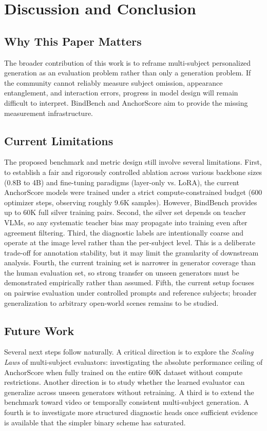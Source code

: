 \section{Discussion and Conclusion}

\subsection{Why This Paper Matters}
The broader contribution of this work is to reframe multi-subject personalized generation as an evaluation problem rather than only a generation problem. If the community cannot reliably measure subject omission, appearance entanglement, and interaction errors, progress in model design will remain difficult to interpret. BindBench and AnchorScore aim to provide the missing measurement infrastructure.

\subsection{Current Limitations}
The proposed benchmark and metric design still involve several limitations. First, to establish a fair and rigorously controlled ablation across various backbone sizes (0.8B to 4B) and fine-tuning paradigms (layer-only vs. LoRA), the current AnchorScore models were trained under a strict compute-constrained budget (600 optimizer steps, observing roughly 9.6K samples). However, BindBench provides up to 60K full silver training pairs. Second, the silver set depends on teacher VLMs, so any systematic teacher bias may propagate into training even after agreement filtering. Third, the diagnostic labels are intentionally coarse and operate at the image level rather than the per-subject level. This is a deliberate trade-off for annotation stability, but it may limit the granularity of downstream analysis. Fourth, the current training set is narrower in generator coverage than the human evaluation set, so strong transfer on unseen generators must be demonstrated empirically rather than assumed. Fifth, the current setup focuses on pairwise evaluation under controlled prompts and reference subjects; broader generalization to arbitrary open-world scenes remains to be studied.

\subsection{Future Work}
Several next steps follow naturally. A critical direction is to explore the \textit{Scaling Laws} of multi-subject evaluators: investigating the absolute performance ceiling of AnchorScore when fully trained on the entire 60K dataset without compute restrictions. Another direction is to study whether the learned evaluator can generalize across unseen generators without retraining. A third is to extend the benchmark toward video or temporally consistent multi-subject generation. A fourth is to investigate more structured diagnostic heads once sufficient evidence is available that the simpler binary scheme has saturated.

